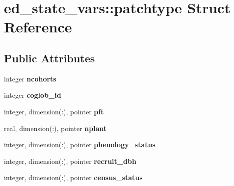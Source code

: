 \hypertarget{structed__state__vars_1_1patchtype}{
\section{ed\_\-state\_\-vars::patchtype Struct Reference}
\label{structed__state__vars_1_1patchtype}
}
\subsection*{Public Attributes}
\begin{DoxyCompactItemize}
\item 
\hypertarget{structed__state__vars_1_1patchtype_a51030f0f55bb8f4360d8afaf5aea4538}{
integer {\bfseries ncohorts}}
\label{structed__state__vars_1_1patchtype_a51030f0f55bb8f4360d8afaf5aea4538}

\item 
\hypertarget{structed__state__vars_1_1patchtype_aa5ca4eed5f3c8cfc04783b235d4b25c7}{
integer {\bfseries coglob\_\-id}}
\label{structed__state__vars_1_1patchtype_aa5ca4eed5f3c8cfc04783b235d4b25c7}

\item 
\hypertarget{structed__state__vars_1_1patchtype_a79cf86108efdd6ae6c30ca6e1733b5de}{
integer, dimension(:), pointer {\bfseries pft}}
\label{structed__state__vars_1_1patchtype_a79cf86108efdd6ae6c30ca6e1733b5de}

\item 
\hypertarget{structed__state__vars_1_1patchtype_a3dcac4da0edef06f8c23781dd17d14a4}{
real, dimension(:), pointer {\bfseries nplant}}
\label{structed__state__vars_1_1patchtype_a3dcac4da0edef06f8c23781dd17d14a4}

\item 
\hypertarget{structed__state__vars_1_1patchtype_a20a93dd203f8127e217e688706322e90}{
integer, dimension(:), pointer {\bfseries phenology\_\-status}}
\label{structed__state__vars_1_1patchtype_a20a93dd203f8127e217e688706322e90}

\item 
\hypertarget{structed__state__vars_1_1patchtype_a524fa533b9ea331f0d5ba35498f0cda7}{
integer, dimension(:), pointer {\bfseries recruit\_\-dbh}}
\label{structed__state__vars_1_1patchtype_a524fa533b9ea331f0d5ba35498f0cda7}

\item 
\hypertarget{structed__state__vars_1_1patchtype_a4c3e9ecdde9d23eb71d0a51709a5f610}{
integer, dimension(:), pointer {\bfseries census\_\-status}}
\label{structed__state__vars_1_1patchtype_a4c3e9ecdde9d23eb71d0a51709a5f610}


\end{DoxyCompactItemize}
